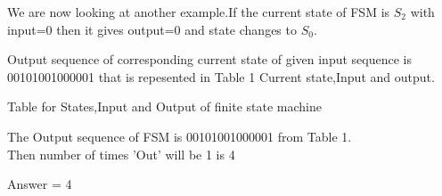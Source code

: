 \documentclass{article}
\begin{document}
We are now looking at another example.If the current state of FSM is $S_2$ with input=0
then it gives output=0 and state changes to $S_0$.


Output sequence of corresponding current state of given input sequence is 00101001000001
that is repesented in Table 1 Current state,Input and output.


\begin{table}[h]
\centering

\caption{Table for States,Input and Output of finite state machine}
\label{table}
\end{table}

The Output sequence of FSM is 00101001000001 from Table 1. \\
Then number of times 'Out' will be 1 is 4

\centering 
Answer = 4
\end{document}
